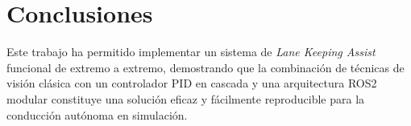 \documentclass[12pt, a4paper]{article}
\begin{document}
\section{Conclusiones}

Este trabajo ha permitido implementar un sistema de \textit{Lane Keeping Assist} funcional de extremo a extremo, demostrando que la combinación de técnicas de visión clásica con un controlador PID en cascada y una arquitectura ROS2 modular constituye una solución eficaz y fácilmente reproducible para la conducción autónoma en simulación.

\end{document}
